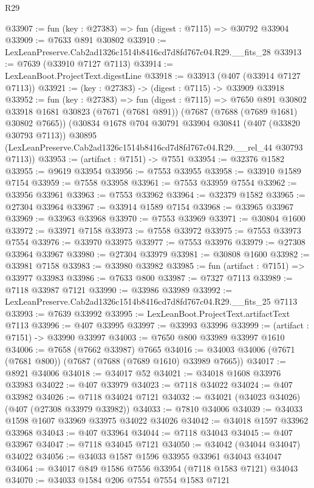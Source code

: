 \begin{lexlean}{R29}
\begin{coremodule}
@33907 := fun (key : @27383) => fun (digest : @7115) => @30792 @33904
@33909 := @7633 @891 @30802
@33910 := LexLeanPreserve.Cab2ad1326c1514b8416cd7d8fd767c04.R29.__fits_28
@33913 := @7639 (@33910 @7127 @7113)
@33914 := LexLeanBoot.ProjectText.digestLine
@33918 := @33913 (@407 (@33914 @7127 @7113))
@33921 := (key : @27383) -> (digest : @7115) -> @33909 @33918
@33952 := fun (key : @27383) =>
  fun (digest : @7115) =>
  @7650
    @891
    @30802
    @33918
    @1681
    @30823
    (@7671 (@7681 @891))
    (@7687 (@7688 (@7689 @1681) @30802 @7665))
    (@30834
      @1678
      @704
      @30791
      @33904
      @30841
      (@407 (@33820 @30793 @7113))
      @30895
      (LexLeanPreserve.Cab2ad1326c1514b8416cd7d8fd767c04.R29.__rel_44 @30793 @7113))
@33953 := (artifact : @7151) -> @7551
@33954 := @32376 @1582
@33955 := @9619 @33954
@33956 := @7553 @33955
@33958 := @33910 @1589 @7154
@33959 := @7558 @33958
@33961 := @7553 @33959 @7554
@33962 := @33956 @33961
@33963 := @7553 @33962
@33964 := @32379 @1582
@33965 := @27304 @33964
@33967 := @33914 @1589 @7154
@33968 := @33965 @33967
@33969 := @33963 @33968
@33970 := @7553 @33969
@33971 := @30804 @1600
@33972 := @33971 @7158
@33973 := @7558 @33972
@33975 := @7553 @33973 @7554
@33976 := @33970 @33975
@33977 := @7553 @33976
@33979 := @27308 @33964 @33967
@33980 := @27304 @33979
@33981 := @30808 @1600
@33982 := @33981 @7158
@33983 := @33980 @33982
@33985 := fun (artifact : @7151) => @33977 @33983
@33986 := @7633 @800
@33987 := @7327 @7113
@33989 := @7118 @33987 @7121
@33990 := @33986 @33989
@33992 := LexLeanPreserve.Cab2ad1326c1514b8416cd7d8fd767c04.R29.__fits_25 @7113
@33993 := @7639 @33992
@33995 := LexLeanBoot.ProjectText.artifactText @7113
@33996 := @407 @33995
@33997 := @33993 @33996
@33999 := (artifact : @7151) -> @33990 @33997
@34003 := @7650 @800 @33989 @33997 @1610
@34006 := @7658 (@7662 @33987) @7665
@34016 := @34003 @34006 (@7671 (@7681 @800)) (@7687 (@7688 (@7689 @1610) @33989 @7665))
@34017 := @8921 @34006
@34018 := @34017 @52
@34021 := @34018 @1608 @33976 @33983
@34022 := @407 @33979
@34023 := @7118 @34022
@34024 := @407 @33982
@34026 := @7118 @34024 @7121
@34032 := @34021 (@34023 @34026) (@407 (@27308 @33979 @33982))
@34033 := @7810 @34006
@34039 := @34033 @1598 @1607 @33969 @33975 @34022 @34026
@34042 := @34018 @1597 @33962 @33968
@34043 := @407 @33964
@34044 := @7118 @34043
@34045 := @407 @33967
@34047 := @7118 @34045 @7121
@34050 := @34042 (@34044 @34047) @34022
@34056 := @34033 @1587 @1596 @33955 @33961 @34043 @34047
@34064 := @34017 @849 @1586 @7556 @33954 (@7118 @1583 @7121) @34043
@34070 := @34033 @1584 @206 @7554 @7554 @1583 @7121

\end{coremodule}
\end{lexlean}
